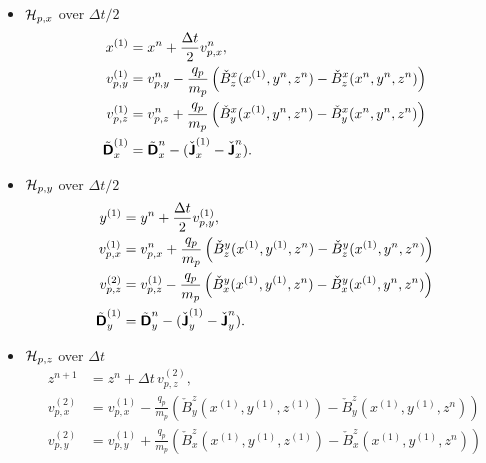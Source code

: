 \documentclass[11pt]{article}
\begin{document}
\begin{itemize}
    \item $\cH_{p,x}$ over $\Delta t/2$
          $$
              \begin{aligned}
                  x^{(1)}               & = x^n + \frac{\Delta t}{2} v_{p,x}^n,                                                         \\
                  v_{p,y}^{(1)}         & = v_{p,y}^{n} - \frac {q_p}{m_p} \left(\check{B}^x_z(x^{(1)},y^n,z^n) - \check{B}^x_z(x^n,y^n,z^n)\right) \\
                  v_{p,z}^{(1)}         & = v_{p,z}^{n} + \frac {q_p}{m_p} \left(\check{B}^x_y(x^{(1)},y^n,z^n) - \check{B}^x_y(x^n,y^n,z^n)\right) \\
                  \tilde{\arrD}_x^{(1)} & = \tilde{\arrD}_x^n -(\check{\arrJ}_x^{(1)}-\check{\arrJ}_x^n).
              \end{aligned}
          $$
    \item $\cH_{p,y}$ over $\Delta t/2$
          $$
              \begin{aligned}
                  y^{(1)}               & = y^n + \frac{\Delta t}{2} v_{p,y}^{(1)},                                                               \\
                  v_{p,x}^{(1)}         & = v_{p,x}^{n} + \frac {q_p}{m_p} \left(\check{B}^y_z(x^{(1)},y^{(1)},z^n) - \check{B}^y_z(x^{(1)},y^n,z^n)\right) \\
                  v_{p,z}^{(2)}         & = v_{p,z}^{(1)} - \frac {q_p}{m_p} \left(\check{B}^y_x(x^{(1)},y^{(1)},z^n) - \check{B}^y_x(x^{(1)},y^n,z^n)\right) \\
                  \tilde{\arrD}_y^{(1)} & = \tilde{\arrD}_y^n -(\check{\arrJ}_y^{(1)}-\check{\arrJ}_y^n).
              \end{aligned}
          $$
    \item $\cH_{p,z}$ over $\Delta t$
          $$
              \begin{aligned}
                  z^{n+1}               & = z^n + \Delta t \, v_{p,z}^{(2)},                                                                              \\
                  v_{p,x}^{(2)}         & = v_{p,x}^{(1)} - \frac {q_p}{m_p} \left(\check{B}^z_y(x^{(1)},y^{(1)},z^{(1)}) - \check{B}^z_y(x^{(1)},y^{(1)},z^n)\right) \\
                  v_{p,y}^{(2)}         & = v_{p,y}^{(1)} + \frac {q_p}{m_p} \left(\check{B}^z_x(x^{(1)},y^{(1)},z^{(1)}) - \check{B}^z_x(x^{(1)},y^{(1)},z^n)\right) \\

\end{aligned}$$
\end{itemize}
\end{document}
